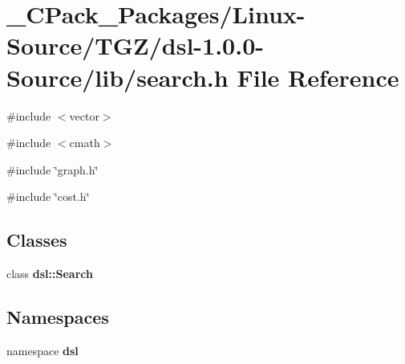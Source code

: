 \section{\_\-CPack\_\-Packages/Linux-\/Source/TGZ/dsl-\/1.0.0-\/Source/lib/search.h File Reference}
\label{__CPack__Packages_2Linux-Source_2TGZ_2dsl-1_80_80-Source_2lib_2search_8h}
{\ttfamily \#include $<$vector$>$}\par
{\ttfamily \#include $<$cmath$>$}\par
{\ttfamily \#include \char`\"{}graph.h\char`\"{}}\par
{\ttfamily \#include \char`\"{}cost.h\char`\"{}}\par
\subsection*{Classes}
\begin{DoxyCompactItemize}
\item 
class {\bf dsl::Search}
\end{DoxyCompactItemize}
\subsection*{Namespaces}
\begin{DoxyCompactItemize}
\item 
namespace {\bf dsl}
\end{DoxyCompactItemize}
